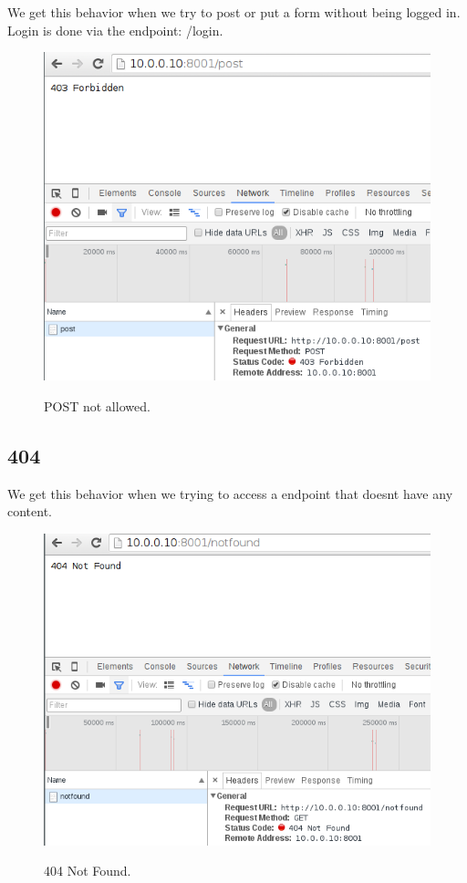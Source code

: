 \documentclass[a4paper,12pt]{article} %
\begin{document}
{We get this behavior when we try to post or put a form without being logged in.
Login is done via the endpoint: /login.

\begin{figure}[H]
    \centering  
    \includegraphics[scale=0.6]{img/screenshots/postnotallowed.png}
	\label{fig:postnotallowed}
	\caption{POST not allowed.}
\end{figure}

\subsection{404}

We get this behavior when we trying to access a endpoint that doesnt have any content.

\begin{figure}[H]
    \centering  
    \includegraphics[scale=0.6]{img/screenshots/notfound.png}
	\label{fig:notfound}
	\caption{404 Not Found.}
\end{figure}

}
\end{document}
